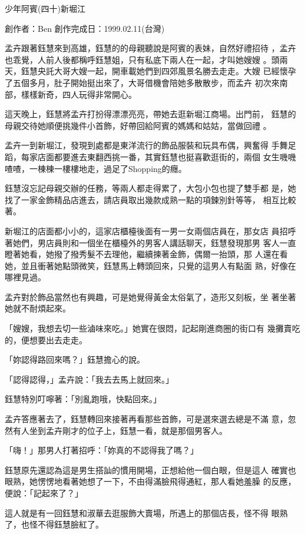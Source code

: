 



少年阿賓(四十)新堀江

創作者：Ben
創作完成日：1999.02.11(台灣)


孟卉跟著鈺慧來到高雄，鈺慧的的母親聽說是阿賓的表妹，自然好禮招待
，孟卉也乖覺，人前人後都稱呼鈺慧姐，只有私底下兩人在一起，才叫她嫂嫂
。頭兩天，鈺慧央託大哥大嫂一起，開車載她們到四郊風景名勝去走走。大嫂
已經懷孕了五個多月，肚子開始挺出來了，大哥借機會陪她多散散步，而孟卉
初次來南部，樣樣新奇，四人玩得非常開心。

這天晚上，鈺慧將孟卉打扮得漂漂亮亮，帶她去逛新堀江商場。出門前，
鈺慧的母親交待她順便挑幾件小首飾，好帶回給阿賓的媽媽和姑姑，當做回禮
。

孟卉一到新堀江，發現到處都是東洋流行的飾品服裝和玩具布偶，興奮得
手舞足蹈，每家店面都要進去東翻西挑一番，其實鈺慧也挺喜歡逛街的，兩個
女生嘰嘰喳喳，一棟棟一樓樓地走，過足了Shopping的癮。

鈺慧沒忘記母親交辦的任務，等兩人都走得累了，大包小包也提了雙手都
是，她找了一家金飾精品店進去，請店員取出幾款成熟一點的項鍊別針等等，
相互比較著。

新堀江的店面都小小的，這家店櫃檯後面有一男一女兩個店員在，那女店
員招呼著她們，男店員則和一個坐在櫃檯外的男客人講話聊天，鈺慧發現那男
客人一直瞪著她看，她撥了撥秀髮不去理他，繼續揀著金飾，偶爾一抬頭，那
人還在看她，並且衝著她點頭微笑，鈺慧馬上轉頭回來，只覺的這男人有點面
熟，好像在哪裡見過。

孟卉對於飾品當然也有興趣，可是她覺得黃金太俗氣了，造形又刻板，坐
著坐著她就不耐煩起來。

「嫂嫂，我想去切一些滷味來吃。」她實在很悶，記起剛進商圈的街口有
幾攤賣吃的，便想要出去走走。

「妳認得路回來嗎？」鈺慧擔心的說。

「認得認得，」孟卉說：「我去去馬上就回來。」

鈺慧特別叮嚀著：「別亂跑哦，快點回來。」

孟卉答應著去了，鈺慧轉回來接著再看那些首飾，可是選來選去總是不滿
意，忽然有人坐到孟卉剛才的位子上，鈺慧一看，就是那個男客人。

「嗨！」那男人打著招呼：「妳真的不認得我了嗎？」

鈺慧原先還認為這是男生搭訕的慣用開場，正想給他一個白眼，但是這人
確實也眼熟，她愣愣地看著她想了一下，不由得滿臉飛得通紅，那人看她羞臊
的反應，便說：「記起來了？」

這人就是有一回鈺慧和淑華去逛服飾大賣場，所遇上的那個店長，怪不得
眼熟了，也怪不得鈺慧臉紅了。

